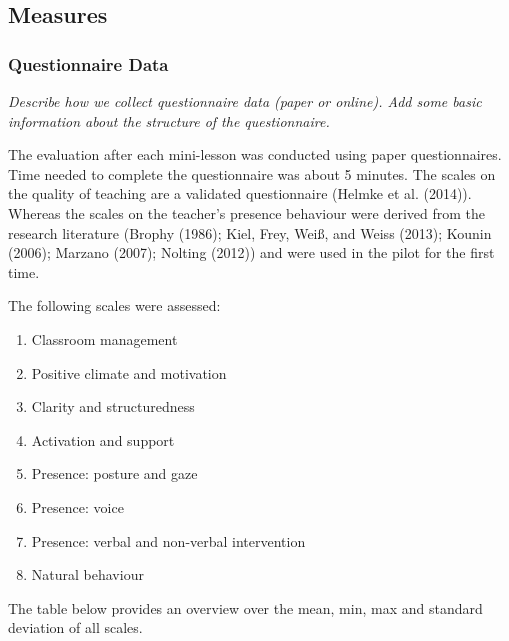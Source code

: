 \documentclass[
  english,
  man,floatsintext]{apa6}
\providecommand{\tightlist}{%
  \setlength{\itemsep}{0pt}\setlength{\parskip}{0pt}}
\begin{document}
\hypertarget{measures}{%
\subsection{Measures}\label{measures}}

\hypertarget{questionnaire-data}{%
\subsubsection{Questionnaire Data}\label{questionnaire-data}}

\emph{Describe how we collect questionnaire data (paper or online). Add some basic information about the structure of the questionnaire.}

The evaluation after each mini-lesson was conducted using paper questionnaires. Time needed to complete the questionnaire was about 5 minutes.
The scales on the quality of teaching are a validated questionnaire (Helmke et al. (2014)). Whereas the scales on the teacher's presence behaviour were derived from the research literature (Brophy (1986); Kiel, Frey, Weiß, and Weiss (2013); Kounin (2006); Marzano (2007); Nolting (2012)) and were used in the pilot for the first time.

The following scales were assessed:

\begin{enumerate}
\def\labelenumi{(\arabic{enumi})}
\tightlist
\item
  Classroom management
\item
  Positive climate and motivation
\item
  Clarity and structuredness
\item
  Activation and support
\item
  Presence: posture and gaze
\item
  Presence: voice
\item
  Presence: verbal and non-verbal intervention
\item
  Natural behaviour
\end{enumerate}

The table below provides an overview over the mean, min, max and standard deviation of all scales.
\end{document}
